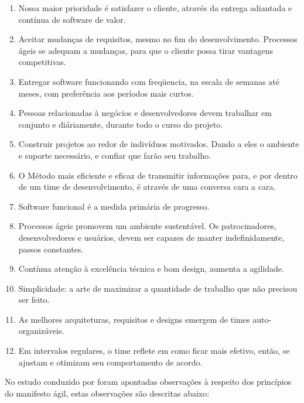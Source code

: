 \begin{enumerate}
    \item Nossa maior prioridade é satisfazer o cliente, através da entrega adiantada e contínua de software de valor.
    \item Aceitar mudanças de requisitos, mesmo no fim do desenvolvimento. Processos ágeis se adequam a mudanças, para que o cliente possa tirar vantagens competitivas.
    \item Entregar software funcionando com freqüencia, na escala de semanas até meses, com preferência aos períodos mais curtos.
    \item Pessoas relacionadas à negócios e desenvolvedores devem trabalhar em conjunto e diáriamente, durante todo o curso do projeto.
    \item Construir projetos ao redor de indivíduos motivados. Dando a eles o ambiente e suporte necessário, e confiar que farão seu trabalho.
    \item O Método mais eficiente e eficaz de transmitir informações para, e por dentro de um time de desenvolvimento, é através de uma conversa cara a cara.
    \item Software funcional é a medida primária de progresso.
    \item Processos ágeis promovem um ambiente sustentável. Os patrocinadores, desenvolvedores e usuários, devem ser capazes de manter indefinidamente, passos constantes.
    \item Contínua atenção à excelência técnica e bom design, aumenta a agilidade.
    \item Simplicidade: a arte de maximizar a quantidade de trabalho que não precisou ser feito.
    \item As melhores arquiteturas, requisitos e designs emergem de times auto-organizáveis.
    \item Em intervalos regulares, o time reflete em como ficar mais efetivo, então, se ajustam e otimizam seu comportamento de acordo.

\end{enumerate}

No estudo conduzido por \cite{waterman2015much} foram apontadas observações à respeito dos princípios do manifesto ágil, estas observações são descritas abaixo:

